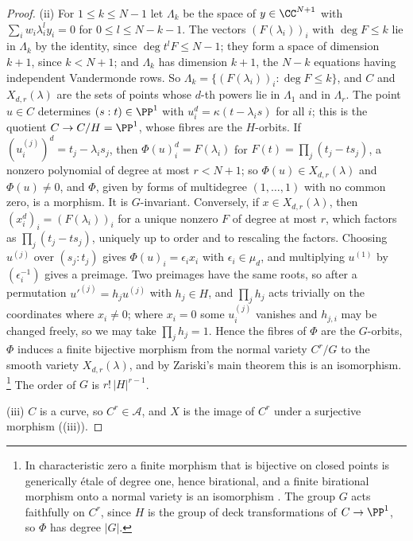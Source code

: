 \begin{proof}
(ii) For $1\le k\le N-1$ let $\Lambda_{k}$ be the space of
$y\in\CC^{N+1}$ with $\sum_{i}w_{i}\lambda_{i}^{l}y_{i}=0$ for
$0\le l\le N-k-1$. The vectors $(F(\lambda_{i}))_{i}$ with $\deg F\le k$ lie
in $\Lambda_{k}$ by the identity, since $\deg t^{l}F\le N-1$; they form a space
of dimension $k+1$, since $k<N+1$; and $\Lambda_{k}$ has dimension $k+1$,
the $N-k$ equations having independent Vandermonde rows. So
$\Lambda_{k}=\{(F(\lambda_{i}))_{i}:\deg F\le k\}$, and $C$ and
$X_{d,r}(\lambda)$ are the sets of points whose $d$-th powers lie in
$\Lambda_{1}$ and in $\Lambda_{r}$. The point $u\in C$ determines
$(s:t)\in\PP^{1}$ with $u_{i}^{d}=\kappa(t-\lambda_{i}s)$ for all $i$; this is
the quotient $C\to C/H=\PP^{1}$, whose fibres are the $H$-orbits. If
$(u^{(j)}_{i})^{d}=t_{j}-\lambda_{i}s_{j}$, then
$\Phi(u)_{i}^{d}=F(\lambda_{i})$ for $F(t)=\prod_{j}(t_{j}-ts_{j})$, a nonzero
polynomial of degree at most $r<N+1$; so $\Phi(u)\in X_{d,r}(\lambda)$ and
$\Phi(u)\ne0$, and $\Phi$, given by forms of multidegree $(1,\dots,1)$ with no
common zero, is a morphism. It is $G$-invariant. Conversely, if $x\in
X_{d,r}(\lambda)$, then $(x_{i}^{d})_{i}=(F(\lambda_{i}))_{i}$ for a unique
nonzero $F$ of degree at most $r$, which factors as
$\prod_{j}(t_{j}-ts_{j})$, uniquely up to order and to rescaling the factors.
Choosing $u^{(j)}$ over $(s_{j}:t_{j})$ gives $\Phi(u)_{i}=\epsilon_{i}x_{i}$
with $\epsilon_{i}\in\mu_{d}$, and multiplying $u^{(1)}$ by
$(\epsilon_{i}^{-1})$ gives a preimage.\enlargethispage{2pt} Two preimages have the same roots, so
after a permutation $u'^{(j)}=h_{j}u^{(j)}$ with $h_{j}\in H$, and $\prod_{j}h_{j}$
acts trivially on the coordinates where $x_{i}\ne0$; where $x_{i}=0$ some
$u^{(j)}_{i}$ vanishes and $h_{j,i}$ may be changed freely, so we may take
$\prod_{j}h_{j}=1$. Hence the fibres of $\Phi$ are the $G$-orbits, $\Phi$
induces a finite bijective morphism from the normal variety $C^{r}/G$ to the
smooth variety $X_{d,r}(\lambda)$, and by Zariski's main theorem this is an
isomorphism.%
\footnote{In characteristic zero a finite morphism that is bijective on
closed points is generically \'etale of degree one, hence birational, and a
finite birational morphism onto a normal variety is an isomorphism
\cite[Chapter~III, Corollary~11.4]{Har77}. The group $G$ acts faithfully on $C^{r}$,
since $H$ is the group of deck transformations of $C\to\PP^{1}$, so
$\Phi$ has degree $|G|$.}
The order of $G$ is $r!\,|H|^{r-1}$.

(iii) $C$ is a curve, so $C^{r}\in\mathcal{A}$, and $X$ is the image of
$C^{r}$ under a surjective morphism ((iii)).


\end{proof}
